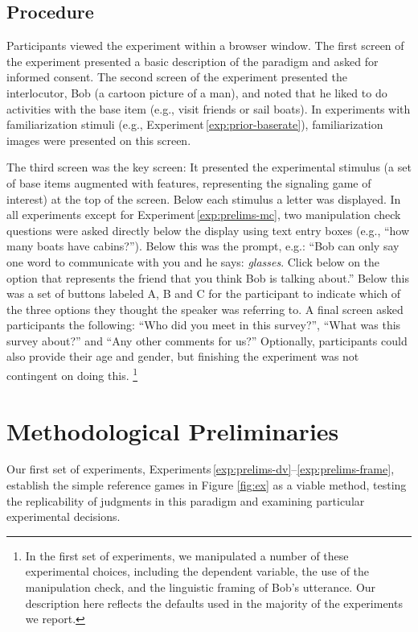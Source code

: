 \documentclass[man,noapacite]{apa2}
\newcounter{Experiment}
\newcommand{\exptref}[1]{Experiment\,\ref{#1}}
\newcommand{\exptrefrange}[2]{Experiments\,\ref{#1}--\ref{#2}}
\begin{document}
\subsection{Procedure}

Participants viewed the experiment within a browser window. The first screen of the experiment presented a basic description of the paradigm and asked for informed consent. The second screen of the experiment presented the interlocutor, Bob (a cartoon picture of a man), and noted that he liked to do activities with the base item (e.g., visit friends or sail boats). In experiments with familiarization stimuli (e.g., \exptref{exp:prior-baserate}),  familiarization images were presented on this screen.

The third screen was the key screen: It presented the experimental stimulus (a set of base items augmented with features, representing the signaling game of interest) at the top of the screen. Below each stimulus a letter was displayed.
In all experiments except for \exptref{exp:prelims-mc}, two manipulation check questions were asked directly below the display using text entry boxes (e.g., ``how many boats have cabins?''). Below this was the prompt, e.g.: ``Bob can only say one word to communicate with you and he says: {\it glasses}. Click below on the option that represents the friend that you think Bob is talking about.'' Below this was a set of buttons labeled A, B and C for the participant to indicate which of the three options they thought the speaker was referring to. A final screen asked participants the following: ``Who did you meet in this survey?'',  ``What was this survey about?'' and ``Any other comments for us?'' Optionally, participants could also provide their age and gender, but finishing the experiment was not contingent on doing this. \footnote{In the first set of experiments, we manipulated a number of these experimental choices, including the dependent variable, the use of the manipulation check, and the linguistic framing of Bob's utterance. Our description here reflects the defaults used in the majority of the experiments we report.}

\section{Methodological Preliminaries}
\label{sec:prelims}

Our first set of experiments, \exptrefrange{exp:prelims-dv}{exp:prelims-frame}, establish the simple reference games in Figure \ref{fig:ex} as a viable method, testing the replicability of judgments in this paradigm and examining particular experimental decisions.
\end{document}
